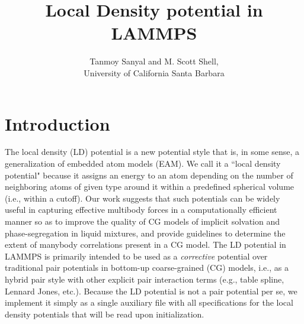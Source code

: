\documentclass[12pt,a4paper]{article}
\title{Local Density potential in LAMMPS}
\author{Tanmoy Sanyal and M. Scott Shell,\\University of California Santa Barbara}
\date{}
\begin{document}
\maketitle

\section*{Introduction}
The local density (LD) potential is a new potential style that is, in some sense, a generalization of embedded atom models (EAM). We call it a ``local density potential" because it assigns an energy to an atom depending on the number of neighboring atoms of given type around it within a predefined spherical volume (i.e., within a cutoff). Our work suggests that such potentials can be widely useful in capturing effective multibody forces in a computationally efficient manner so as to improve the quality of CG models of implicit solvation\cite{sanyal_2016} and phase-segregation in liquid mixtures\cite{sanyal_2018}, and provide guidelines to determine the extent of manybody correlations present in a CG model.\cite{rosenberger_2019} The LD potential in LAMMPS is primarily intended to be used as a \emph{corrective} potential over traditional pair potentials in bottom-up coarse-grained (CG) models, i.e., as a hybrid pair style with other explicit pair interaction terms (e.g., table spline, Lennard Jones, etc.). Because the LD potential is not a pair potential per se, we implement it simply as a single auxiliary file with all specifications for the local density potentials that will be read upon initialization.\\ 
%
%
%
\end{document}
